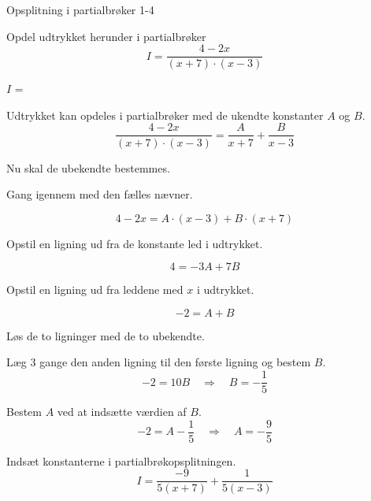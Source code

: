 \documentclass{article}
\begin{document}
\begin{exercise}{Opsplitning i partialbrøker 1-4}
	
	Opdel udtrykket herunder i partialbrøker
	\[
	I = \frac{4 - 2x}{(x + 7) \cdot (x - 3)}
	\]
	
	$I$ =  
	
	\hint
	Udtrykket kan opdeles i partialbrøker med de ukendte konstanter $A$ og $B$.
	\[
	\frac{4 - 2x}{(x + 7) \cdot (x - 3)} = 
	\frac{A}{x + 7} + \frac{B}{x - 3}
	\]
	
	\hint
	Nu skal de ubekendte bestemmes.
	
	\hint
	Gang igennem med den fælles nævner.
	
	\hint
	\[
	4 - 2x = A \cdot (x - 3) + B \cdot (x + 7)
	\]
	
	\hint
	Opstil en ligning ud fra de konstante led i udtrykket.
	
	\hint
	\[
	4 = -3A + 7B
	\]
	
	\hint
	Opstil en ligning ud fra leddene med $x$ i udtrykket.
	
	\hint
	\[
	-2 = A + B
	\]
	
	\hint
	Løs de to ligninger med de to ubekendte.
	
	\hint
	Læg 3 gange den anden ligning til den første ligning og bestem $B$.
	\[
	-2 = 10B \quad	\Rightarrow		\quad		B = -\frac{1}{5}
	\]
	
	\hint
	Bestem $A$ ved at indsætte værdien af $B$.
	\[
	-2 =  A - \frac{1}{5} \quad 	\Rightarrow		\quad A = -\frac{9}{5}
	\]
	
	\hint
	Indsæt konstanterne i partialbrøkopsplitningen.
	\[
	I = \frac{-9}{5(x+7)} + \frac{1}{5(x-3)}
	\]
	
	
	
\end{exercise}
\end{document}
